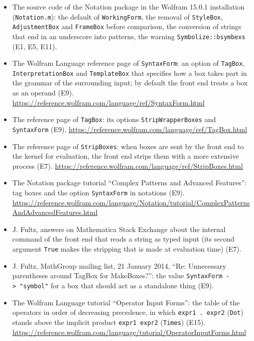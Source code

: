 \documentclass[
  10pt,
]{article}
\providecommand{\tightlist}{%
  \setlength{\itemsep}{0pt}\setlength{\parskip}{0pt}}
\begin{document}
\begin{itemize}
\tightlist
\item
  The source code of the Notation package in the Wolfram 15.0.1
  installation (\texttt{Notation.m}): the default of
  \texttt{WorkingForm}, the removal of \texttt{StyleBox},
  \texttt{AdjustmentBox} and \texttt{FrameBox} before comparison, the
  conversion of strings that end in an underscore into patterns, the
  warning \texttt{Symbolize::bsymbexs} (E1, E5, E11).
\item
  The Wolfram Language reference page of \texttt{SyntaxForm}: an option
  of \texttt{TagBox}, \texttt{InterpretationBox} and
  \texttt{TemplateBox} that specifies how a box takes part in the
  grammar of the surrounding input; by default the front end treats a
  box as an operand (E9).
  \url{https://reference.wolfram.com/language/ref/SyntaxForm.html}
\item
  The reference page of \texttt{TagBox}: its options
  \texttt{StripWrapperBoxes} and \texttt{SyntaxForm} (E9).
  \url{https://reference.wolfram.com/language/ref/TagBox.html}
\item
  The reference page of \texttt{StripBoxes}: when boxes are sent by the
  front end to the kernel for evaluation, the front end strips them with
  a more extensive process (E7).
  \url{https://reference.wolfram.com/language/ref/StripBoxes.html}
\item
  The Notation package tutorial ``Complex Patterns and Advanced
  Features'': tag boxes and the option \texttt{SyntaxForm} in notations
  (E9).
  \url{https://reference.wolfram.com/language/Notation/tutorial/ComplexPatternsAndAdvancedFeatures.html}
\item
  J. Fultz, answers on Mathematica Stack Exchange about the internal
  command of the front end that reads a string as typed input (its
  second argument \texttt{True} makes the stripping that is made at
  evaluation time) (E7).
\item
  J. Fultz, MathGroup mailing list, 21 January 2014, ``Re: Unnecessary
  parentheses around TagBox for MakeBoxes?'': the value
  \texttt{SyntaxForm\ -\textgreater{}\ "symbol"} for a box that should
  act as a standalone thing (E9).
\item
  The Wolfram Language tutorial ``Operator Input Forms'': the table of
  the operators in order of decreasing precedence, in which
  \texttt{expr1\ .\ expr2} (\texttt{Dot}) stands above the implicit
  product \texttt{expr1\ expr2} (\texttt{Times}) (E15).
  \url{https://reference.wolfram.com/language/tutorial/OperatorInputForms.html}

\end{itemize}
\end{document}
